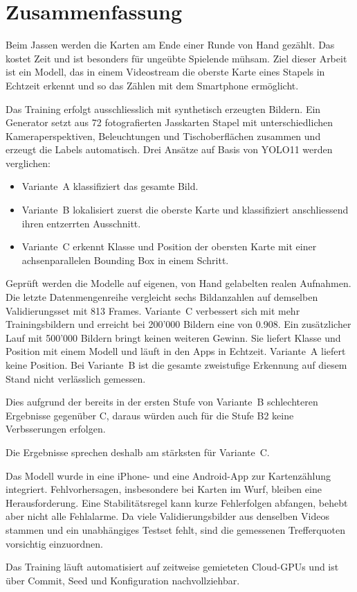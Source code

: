 \section*{Zusammenfassung}

Beim Jassen werden die Karten am Ende einer Runde von Hand gezählt. Das
kostet Zeit und ist besonders für ungeübte Spielende mühsam. Ziel dieser
Arbeit ist ein Modell, das in einem Videostream die oberste Karte eines
Stapels in Echtzeit erkennt und so das Zählen mit dem Smartphone ermöglicht.

Das Training erfolgt ausschliesslich mit synthetisch erzeugten Bildern. Ein
Generator setzt aus 72 fotografierten Jasskarten Stapel mit unterschiedlichen
Kameraperspektiven, Beleuchtungen und Tischoberflächen zusammen und erzeugt
die Labels automatisch. Drei Ansätze auf Basis von YOLO11 werden verglichen:

\begin{itemize}
  \item Variante~A klassifiziert das gesamte Bild.
  \item Variante~B lokalisiert zuerst die oberste Karte und klassifiziert
    anschliessend ihren entzerrten Ausschnitt.
  \item Variante~C erkennt Klasse und Position der obersten Karte mit einer
    achsenparallelen Bounding Box in einem Schritt.
\end{itemize}

Geprüft werden die Modelle auf eigenen, von Hand gelabelten realen Aufnahmen.
Die letzte Datenmengenreihe vergleicht sechs Bildanzahlen auf demselben
Validierungsset mit 813 Frames. Variante~C verbessert sich mit mehr
Trainingsbildern und erreicht bei 200'000 Bildern eine  von 0.908.
Ein zusätzlicher Lauf mit 500'000 Bildern bringt keinen weiteren Gewinn.
Sie liefert Klasse und Position mit einem Modell und läuft in den Apps
in Echtzeit. Variante~A liefert keine Position. Bei Variante~B ist die
gesamte zweistufige Erkennung auf diesem Stand nicht verlässlich gemessen.

Dies aufgrund der bereits in der ersten Stufe von Variante~B schlechteren Ergebnisse gegenüber C, daraus würden auch für die Stufe B2 keine Verbsserungen erfolgen.

Die Ergebnisse sprechen deshalb am stärksten für Variante~C.

Das Modell wurde in eine iPhone- und eine Android-App zur Kartenzählung
integriert. Fehlvorhersagen, insbesondere bei Karten im Wurf, bleiben eine
Herausforderung. Eine Stabilitätsregel kann kurze Fehlerfolgen abfangen,
behebt aber nicht alle Fehlalarme. Da viele Validierungsbilder aus denselben
Videos stammen und ein unabhängiges Testset fehlt, sind die gemessenen
Trefferquoten vorsichtig einzuordnen.


Das Training läuft automatisiert auf
zeitweise gemieteten Cloud-GPUs und ist über Commit, Seed und Konfiguration
nachvollziehbar.

\clearpage
